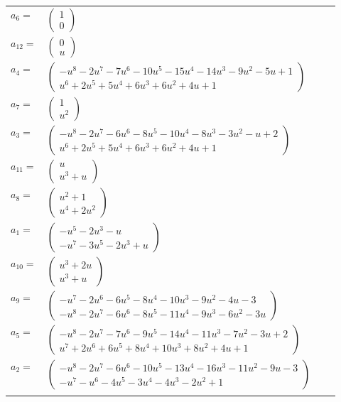 \documentclass[1p]{elsarticle_modified}
\theoremstyle{definition}
\begin{document}
\begin{tabular}{m{7pt} m{180pt} m{7pt} m{180pt} }
\flushright $a_{6}=$&$\begin{pmatrix}1\\0\end{pmatrix}$ \\
\flushright $a_{12}=$&$\begin{pmatrix}0\\u\end{pmatrix}$ \\
\flushright $a_{4}=$&$\begin{pmatrix}- u^8-2 u^7-7 u^6-10 u^5-15 u^4-14 u^3-9 u^2-5 u+1\\u^6+2 u^5+5 u^4+6 u^3+6 u^2+4 u+1\end{pmatrix}$ \\
\flushright $a_{7}=$&$\begin{pmatrix}1\\u^2\end{pmatrix}$ \\
\flushright $a_{3}=$&$\begin{pmatrix}- u^8-2 u^7-6 u^6-8 u^5-10 u^4-8 u^3-3 u^2- u+2\\u^6+2 u^5+5 u^4+6 u^3+6 u^2+4 u+1\end{pmatrix}$ \\
\flushright $a_{11}=$&$\begin{pmatrix}u\\u^3+u\end{pmatrix}$ \\
\flushright $a_{8}=$&$\begin{pmatrix}u^2+1\\u^4+2 u^2\end{pmatrix}$ \\
\flushright $a_{1}=$&$\begin{pmatrix}- u^5-2 u^3- u\\- u^7-3 u^5-2 u^3+u\end{pmatrix}$ \\
\flushright $a_{10}=$&$\begin{pmatrix}u^3+2 u\\u^3+u\end{pmatrix}$ \\
\flushright $a_{9}=$&$\begin{pmatrix}- u^7-2 u^6-6 u^5-8 u^4-10 u^3-9 u^2-4 u-3\\- u^8-2 u^7-6 u^6-8 u^5-11 u^4-9 u^3-6 u^2-3 u\end{pmatrix}$ \\
\flushright $a_{5}=$&$\begin{pmatrix}- u^8-2 u^7-7 u^6-9 u^5-14 u^4-11 u^3-7 u^2-3 u+2\\u^7+2 u^6+6 u^5+8 u^4+10 u^3+8 u^2+4 u+1\end{pmatrix}$ \\
\flushright $a_{2}=$&$\begin{pmatrix}- u^8-2 u^7-6 u^6-10 u^5-13 u^4-16 u^3-11 u^2-9 u-3\\- u^7- u^6-4 u^5-3 u^4-4 u^3-2 u^2+1\end{pmatrix}$\\&\end{tabular}
\end{document}
